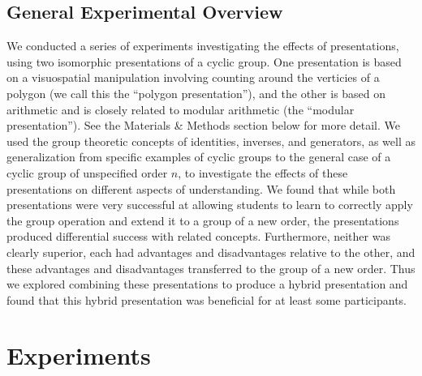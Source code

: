 \documentclass[man,mask,10pt]{apa6}
\begin{document}
\subsection{General Experimental Overview}
We conducted a series of experiments investigating the effects of presentations, using two isomorphic presentations of a cyclic group. One presentation is based on a visuospatial manipulation involving counting around the verticies of a polygon (we call this the ``polygon presentation''), and the other is based on arithmetic and is closely related to modular arithmetic (the ``modular presentation''). See the Materials \& Methods section below for more detail. We used the group theoretic concepts of identities, inverses, and generators, as well as generalization from specific examples of cyclic groups to the general case of a cyclic group of unspecified order $n$, to investigate the effects of these presentations on different aspects of understanding. We found that while both presentations were very successful at allowing students to learn to correctly apply the group operation and extend it to a group of a new order, the presentations produced differential success with related concepts. Furthermore, neither was clearly superior, each had advantages and disadvantages relative to the other, and these advantages and disadvantages transferred to the group of a new order. Thus we explored combining these presentations to produce a hybrid presentation and found that this hybrid presentation was beneficial for at least some participants. 
\section{Experiments}
\end{document}
